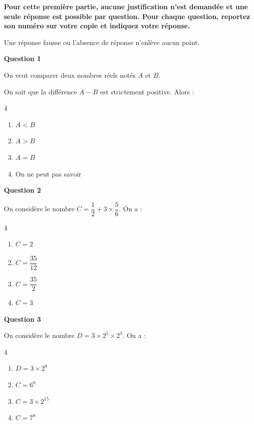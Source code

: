 \textbf{Pour cette première partie, aucune justification n'est demandée et une seule réponse est possible par question. Pour chaque question, reportez son numéro sur votre copie et indiquez votre réponse.}

	Une réponse fausse ou l'absence de réponse n'enlève aucun point.

\bigskip

	\textbf{Question 1}

On veut comparer deux nombres réels notés $A$ et $B$.

On sait que la différence $A - B$ est strictement positive. Alors :

\begin{multicols}{4}
\begin{enumerate}[label=\textbf{\alph* .}]
\item $A<B$
\item $A>B$
\item $A=B$
\item On ne peut pas savoir
\end{enumerate}
\end{multicols}

	\textbf{Question 2}

On considère le nombre $C=\dfrac{1}{2}+3\times\dfrac{5}{6}$. On a :

\begin{multicols}{4}
\begin{enumerate}[label=\textbf{\alph* .}]
\item $C = 2$
\item $C = \dfrac{35}{12}$
\item $C = \dfrac{35}{2}$
\item $C = 3$
\end{enumerate}
\end{multicols}

\textbf{Question 3}

On considère le nombre $D=3 \times 2^5 \times 2^3$. On a :

\begin{multicols}{4}
\begin{enumerate}[label=\textbf{\alph* .}]
\item $D = 3\times 2^{8}$
\item $C = 6^{8}$
\item $C = 3\times 2^{15}$
\item $C = 7^{8}$
\end{enumerate}
\end{multicols}


